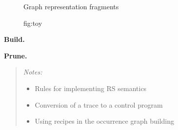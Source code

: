 \begin{figure}
\centering
{}
\caption{Graph representation fragments}
\caption{fig:toy}
\end{figure}


\medskip\noindent\textbf{Build.}
%

\medskip\noindent\textbf{Prune.}
%


\begin{quote}\it Notes:
\begin{itemize}
\item Rules for implementing RS semantics
\item Conversion of a trace to a control program
\item Using recipes in the occurrence graph building
\end{itemize}
\end{quote}